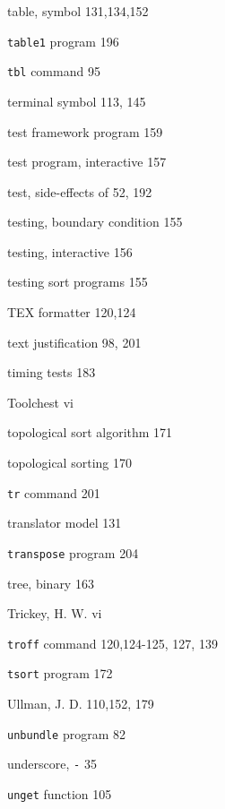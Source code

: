 \begin{multicols}{3}
\hangindent=3pc  table, symbol 131,134,152

\hangindent=3pc  \verb'table1' program 196

\hangindent=3pc  \verb'tbl' command 95

\hangindent=3pc  terminal symbol 113, 145

\hangindent=3pc  test framework program 159

\hangindent=3pc  test program, interactive 157

\hangindent=3pc  test, side-effects of 52, 192

\hangindent=3pc  testing, boundary condition 155

\hangindent=3pc  testing, interactive 156

\hangindent=3pc  testing sort programs 155

\hangindent=3pc  TEX formatter 120,124

\hangindent=3pc  text justification 98, 201

\hangindent=3pc  timing tests 183

\hangindent=3pc  Toolchest vi

\hangindent=3pc  topological sort algorithm 171

\hangindent=3pc  topological sorting 170

\hangindent=3pc  \verb'tr' command 201

\hangindent=3pc  translator model 131

\hangindent=3pc  \verb'transpose' program 204

\hangindent=3pc  tree, binary 163

\hangindent=3pc  Trickey, H. W. vi

\hangindent=3pc  \verb'troff' command 120,124-125, 127, 139

\hangindent=3pc  \verb'tsort' program 172





\hangindent=3pc  Ullman, J. D. 110,152, 179

\hangindent=3pc  \verb'unbundle' program 82

\hangindent=3pc  underscore, \verb'-' 35

\hangindent=3pc  \verb'unget' function 105


\end{multicols}
